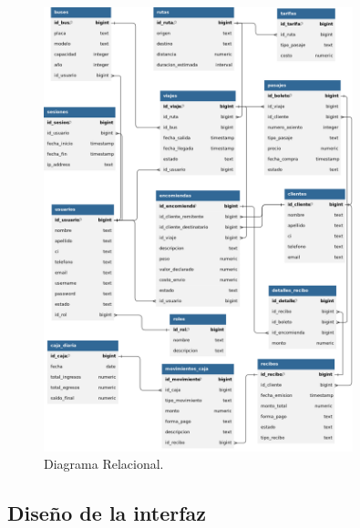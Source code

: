 	\vspace{0.3cm} %
	
	\begin{figure}[!h] %
		\caption[Diagrama Relacional]
		{\newline Diagrama Relacional.} %
		\centering
		\includegraphics[width=0.8\textwidth]{imagenes/cap_3/modelo_relacional.png} %
		
		\begin{flushleft}
		\end{flushleft}
		\vspace{-16pt}
		\label{fig:diag_rela} %
	\end{figure}
	
	\subsection{Diseño de la interfaz}
	
